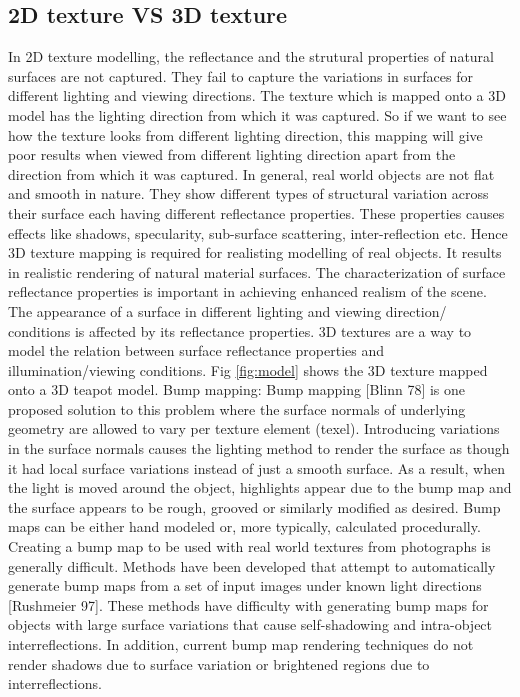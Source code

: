 \subsection{2D texture VS 3D texture}

In 2D texture modelling, the reflectance and the strutural properties of natural surfaces
are not captured. They fail to capture the variations in surfaces for different lighting and
viewing directions. The texture which is mapped onto a 3D model has
the lighting direction from which it was captured. So if we want to see how the texture looks from
different lighting direction, this mapping will give poor results when viewed from different
lighting direction apart from the direction from which it was captured. In general, real world objects
are not flat and smooth in nature. They show different types of structural variation across their
surface each having different reflectance properties. These properties causes effects like shadows,
specularity, sub-surface scattering, inter-reflection etc. Hence 3D texture mapping
is required for realisting modelling of real objects.
It results in realistic rendering
of natural material surfaces. The characterization of surface reflectance properties is important in
achieving enhanced realism of the scene. The appearance of a surface in different lighting and viewing direction/
conditions is affected by its reflectance properties.
3D textures are a way to model the relation between surface reflectance
properties and illumination/viewing conditions. Fig \ref{fig:model} shows the
3D texture mapped onto a 3D teapot model. 
Bump mapping:
Bump mapping [Blinn 78] is one proposed solution to this
problem where the surface normals of underlying geometry are
allowed to vary per texture element (texel). Introducing variations
in the surface normals causes the lighting method to render the
surface as though it had local surface variations instead of just a
smooth surface. As a result, when the light is moved around the
object, highlights appear due to the bump map and the surface
appears to be rough, grooved or similarly modified as desired.
Bump maps can be either hand modeled or, more typically,
calculated procedurally. Creating a bump map to be used with real
world textures from photographs is generally difficult. Methods
have been developed that attempt to automatically generate bump
maps from a set of input images under known light directions
[Rushmeier 97]. These methods have difficulty with generating
bump maps for objects with large surface variations that cause
self-shadowing and intra-object interreflections. In addition,
current bump map rendering techniques do not render shadows
due to surface variation or brightened regions due to
interreflections.

